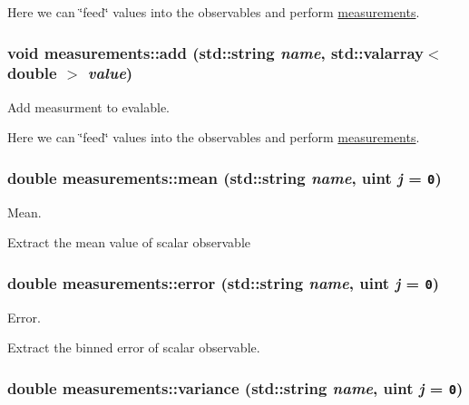 Here we can \char`\"{}feed\char`\"{} values into the observables and perform \hyperlink{classmeasurements}{measurements}. \hypertarget{classmeasurements_4ec8503130241dbe69551d91c16ae493}{
\subsubsection[add]{\setlength{\rightskip}{0pt plus 5cm}void measurements::add (std::string {\em name}, \/  std::valarray$<$ double $>$ {\em value})}}
\label{classmeasurements_4ec8503130241dbe69551d91c16ae493}


Add measurment to evalable. 

Here we can \char`\"{}feed\char`\"{} values into the observables and perform \hyperlink{classmeasurements}{measurements}. \hypertarget{classmeasurements_31f97f8609ffa441bddf91214f8b00d6}{
\subsubsection[mean]{\setlength{\rightskip}{0pt plus 5cm}double measurements::mean (std::string {\em name}, \/  uint {\em j} = {\tt 0})}}
\label{classmeasurements_31f97f8609ffa441bddf91214f8b00d6}


Mean. 

Extract the mean value of scalar observable \hypertarget{classmeasurements_1d661d53942575a15cbe1da08c11c643}{
\subsubsection[error]{\setlength{\rightskip}{0pt plus 5cm}double measurements::error (std::string {\em name}, \/  uint {\em j} = {\tt 0})}}
\label{classmeasurements_1d661d53942575a15cbe1da08c11c643}


Error. 

Extract the binned error of scalar observable. \hypertarget{classmeasurements_264dc7ff4d785f16bdb5acbfea94d96c}{
\subsubsection[variance]{\setlength{\rightskip}{0pt plus 5cm}double measurements::variance (std::string {\em name}, \/  uint {\em j} = {\tt 0})}}
\label{classmeasurements_264dc7ff4d785f16bdb5acbfea94d96c}



